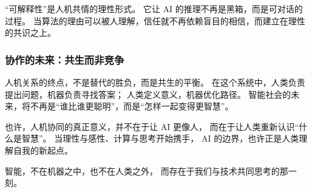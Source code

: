 “可解释性”是人机共情的理性形式。  
它让 AI 的推理不再是黑箱，而是可对话的过程。  
当算法的理由可以被人理解，信任就不再依赖盲目的相信，而建立在理性的共识之上。

\subsubsection{协作的未来：共生而非竞争}

人机关系的终点，不是替代的胜负，而是共生的平衡。  
在这个系统中，人类负责提出问题，机器负责寻找答案；  
人类定义意义，机器优化路径。  
智能社会的未来，将不再是“谁比谁更聪明”，而是“怎样一起变得更智慧”。

也许，人机协同的真正意义，并不在于让 AI 更像人，  
而在于让人类重新认识“什么是智慧”。  
当理性与感性、计算与思考开始携手，  
AI 的边界，也许正是人类理解自我的新起点。

\begin{center}
智能，不在机器之中，也不在人类之外，  
而存在于我们与技术共同思考的那一刻。  
\end{center}